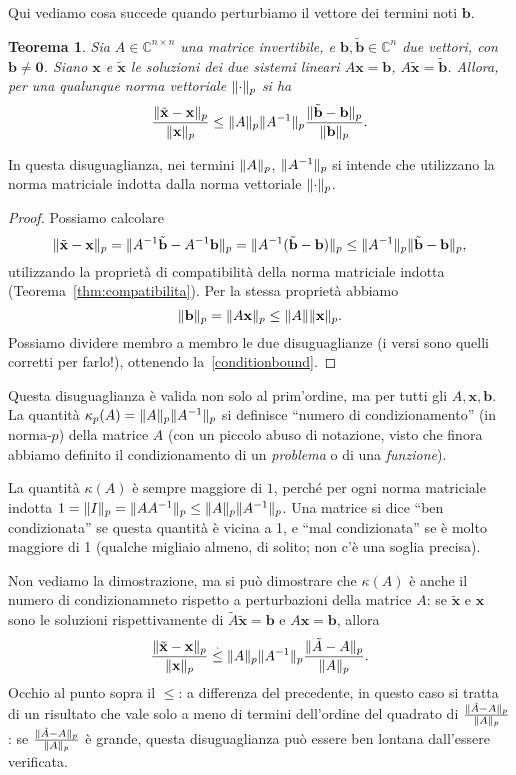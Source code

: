 \documentclass[a4paper]{report}
\DeclarePairedDelimiter{\norm}{\lVert}{\rVert}
\newtheorem{theorem}{Teorema}[chapter]
\theoremstyle{definiton}
\theoremstyle{remark}
\newcommand{\x}{\mathbf{x}}
\renewcommand{\b}{\mathbf{b}}
\begin{document}
Qui vediamo cosa succede quando perturbiamo il vettore dei termini noti $\b$. 
\begin{theorem}
    Sia $A\in \mathbb{C}^{n\times n}$ una matrice invertibile, e $\b,\tilde{\b} \in \mathbb{C}^n$ due vettori, con $\b\neq \mathbf{0}$. Siano $\x$ e $\tilde{\x}$ le soluzioni dei due sistemi lineari $A\x=\b$, $A\tilde{\x}=\tilde{\b}$. Allora, per una qualunque norma vettoriale $\norm{\cdot}_p$ si ha
    \begin{equation} \label{conditionbound}
        \frac{\norm{\tilde{\x}-\x}_p}{\norm{\x}_p} \leq \norm{A}_p\norm{A^{-1}}_p \frac{\norm{\tilde{\b}-\b}_p}{\norm{\b}_p}.    
    \end{equation}
\end{theorem}
In questa disuguaglianza, nei termini $\norm{A}_p$, $\norm{A^{-1}}_p$ si intende che utilizzano la norma matriciale indotta dalla norma vettoriale $\norm{\cdot}_p$.
\begin{proof}
Possiamo calcolare
\[
\norm{\tilde{\x}-\x}_p = \norm{A^{-1}\tilde{\b} - A^{-1}\b}_p = \norm{A^{-1}(\tilde{\b}-\b)}_p \leq  \norm{A^{-1}}_p\norm{\tilde{\b}-\b}_p,
\]
utilizzando la proprietà di compatibilità della norma matriciale indotta (Teorema~\ref{thm:compatibilita}). Per la stessa proprietà abbiamo
\[
\norm{\b}_p = \norm{A \x}_p \leq \norm{A}\norm{\x}_p.
\]
Possiamo dividere membro a membro le due disuguaglianze (i versi sono quelli corretti per farlo!), ottenendo la~\eqref{conditionbound}.
\end{proof}

Questa disuguaglianza è valida non solo al prim'ordine, ma per tutti gli $A,\x,\b$. La quantità $\kappa_p(A) = \norm{A}_p\norm{A^{-1}}_p$ si definisce ``numero di condizionamento'' (in norma-$p$) della matrice $A$ (con un piccolo abuso di notazione, visto che finora abbiamo definito il condizionamento di un \emph{problema} o di una \emph{funzione}).

La quantità $\kappa(A)$ è sempre maggiore di $1$, perché per ogni norma matriciale indotta $1 = \norm{I}_p = \norm{AA^{-1}}_p \leq \norm{A}_p\norm{A^{-1}}_p$. Una matrice si dice ``ben condizionata'' se questa quantità è vicina a 1, e ``mal condizionata'' se è molto maggiore di 1 (qualche migliaio almeno, di solito; non c'è una soglia precisa).

Non vediamo la dimostrazione, ma si può dimostrare che $\kappa(A)$ è anche il numero di condizionamneto rispetto a perturbazioni della matrice $A$: se $\tilde{\x}$ e $\x$ sono le soluzioni rispettivamente di $\tilde{A}\tilde{\x}=\b$ e $A\x=\b$, allora
\[
\frac{\norm{\tilde{\x}-\x}_p}{\norm{\x}_p} \mathrel{\stackrel{.}{\leq}} \norm{A}_p\norm{A^{-1}}_p \frac{\norm{\tilde{A}-A}_p}{\norm{A}_p}.
\]
Occhio al punto sopra il $\leq$: a differenza del precedente, in questo caso si tratta di un risultato che vale solo a meno di termini dell'ordine del quadrato di $\frac{\norm{\tilde{A}-A}_p}{\norm{A}_p}$: se $\frac{\norm{\tilde{A}-A}_p}{\norm{A}_p}$ è grande, questa disuguaglianza può essere ben lontana dall'essere verificata.
\end{document}
